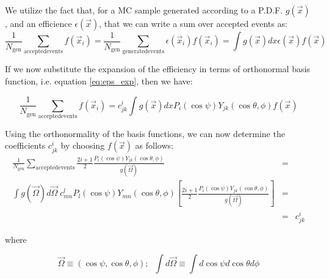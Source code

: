\documentclass[a4paper,9pt,twoside]{article}
\begin{document}


We utilize the fact that, for a MC sample generated according to a P.D.F. $g(\vec{x})$,
and an efficience $\epsilon(\vec{x})$, that we can write a sum over accepted events as:
\begin{equation}
  \frac{1}{N_{\mathrm{gen}}} \sum_{\mathrm{accepted events}} f(\vec{x}_i) = \frac{1}{N_{\mathrm{gen}}} \sum_{\mathrm{generated events}} \epsilon(\vec{x}_i) f(\vec{x}_i) =  \int g(\vec{x})dx \epsilon(\vec{x}) f(\vec{x})
\end{equation}

If we now substitute the expansion of the efficiency in terms of orthonormal basis function,
i.e. equation \ref{eq:eps_exp}, then we have:

\begin{equation}
  \frac{1}{N_{\mathrm{gen}}} \sum_{\mathrm{accepted events}} f(\vec{x}_i) = c^i_{jk}  \int g(\vec{x})dx P_i(\cos\psi)Y_{jk}(\cos\theta,\phi)  f(\vec{x})
\end{equation}

Using the orthonormality of the basis functions, we can now determine the coefficients $c^i_{jk}$ 
by  choosing $f(\vec{x})$ as follows:
\begin{eqnarray}
\frac{1}{N_{\mathrm{gen}}} \sum_{\mathrm{accepted events}} \frac{2i+1}{2}\frac{ P_i(\cos\psi)Y_{jk}(\cos\theta,\phi) }{ g(\vec{\Omega}) }  &=&\\
    \int g(\vec{\Omega})d\vec{\Omega}\; c^l_{mn} P_l(\cos\psi)Y_{mn}(\cos\theta,\phi) \left[  \frac{2i+1}{2}\frac{ P_i(\cos\psi)Y_{jk}(\cos\theta,\phi) }{ g(\vec{\Omega}) } \right] &=&\\
    &=& c^i_{jk}
\end{eqnarray}

where

\begin{equation}
\vec{\Omega} \equiv (\cos\psi,\cos\theta,\phi);\;\; \int d\vec{\Omega} \equiv \int d\cos\psi d\cos\theta d\phi
\end{equation}
\end{document}
